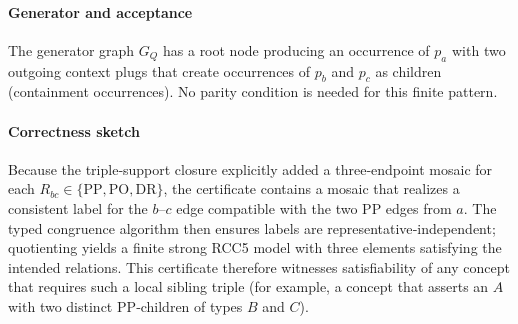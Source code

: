\documentclass[11pt]{article}
\newcommand{\PP}{\mathrm{PP}}
\newcommand{\DR}{\mathrm{DR}}
\newcommand{\PO}{\mathrm{PO}}
\begin{document}
\paragraph{Generator and acceptance}
The generator graph $G_Q$ has a root node producing an occurrence of $p_a$
with two outgoing context plugs that create occurrences of $p_b$ and $p_c$
as children (containment occurrences). No parity condition is needed for this
finite pattern.

\paragraph{Correctness sketch}
Because the triple‑support closure explicitly added a three‑endpoint mosaic
for each $R_{bc}\in\{\PP,\PO,\DR\}$, the certificate contains a mosaic that
realizes a consistent label for the $b$–$c$ edge compatible with the two
$\PP$ edges from $a$. The typed congruence algorithm then ensures labels are
representative‑independent; quotienting yields a finite strong RCC5 model
with three elements satisfying the intended relations. This certificate
therefore witnesses satisfiability of any concept that requires such a
local sibling triple (for example, a concept that asserts an $A$ with two
distinct $\PP$‑children of types $B$ and $C$).



\end{document}
